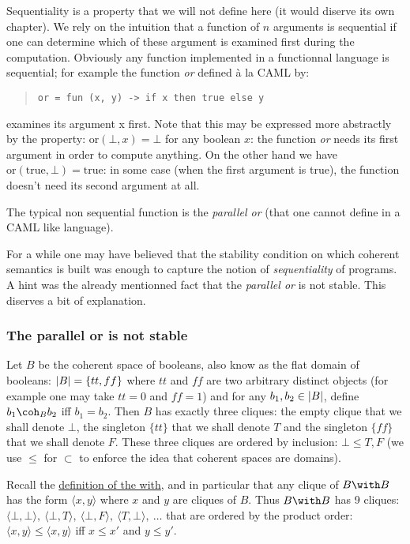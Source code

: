 Sequentiality is a property that we will not define here (it would
diserve its own chapter). We rely on the intuition that a function of
\(n\) arguments is sequential if one can determine which of these
argument is examined first during the computation. Obviously any
function implemented in a functionnal language is sequential; for
example the function \emph{or} defined à la CAML by:
\begin{quotation}
\texttt{or\ =\ fun\ (x,\ y)\ -\textgreater{}\ if\ x\ then\ true\ else\ y}
\end{quotation}
examines its argument x first. Note that this may be expressed more
abstractly by the property: \(\mathrm{or}(\bot, x) = \bot\) for any
boolean \(x\): the function \emph{or} needs its first argument in order
to compute anything. On the other hand we have
\(\mathrm{or}(\mathrm{true}, \bot) = \mathrm{true}\): in some case (when
the first argument is true), the function doesn't need its second
argument at all.

The typical non sequential function is the \emph{parallel or} (that one
cannot define in a CAML like language).

For a while one may have believed that the stability condition on which
coherent semantics is built was enough to capture the notion of
\emph{sequentiality} of programs. A hint was the already mentionned fact
that the \emph{parallel or} is not stable. This diserves a bit of
explanation.

\subsubsection{The parallel or is not stable}\label{the-parallel-or-is-not-stable}

Let \(B\) be the coherent space of booleans, also know as the flat
domain of booleans: \(\left|B\right| = \{tt, ff\}\) where \(tt\) and \(ff\) are
two arbitrary distinct objects (for example one may take \(tt = 0\) and
\(ff = 1\)) and for any \(b_1, b_2\in \left|B\right|\), define \(b_1\coh_B b_2\)
iff \(b_1 = b_2\). Then \(B\) has exactly three cliques: the empty
clique that we shall denote \(\bot\), the singleton \(\{tt\}\) that we
shall denote \(T\) and the singleton \(\{ff\}\) that we shall denote
\(F\). These three cliques are ordered by inclusion: \(\bot \leq T, F\)
(we use \(\leq\) for \(\subset\) to enforce the idea that coherent
spaces are domains).

Recall the \hyperref[cartesian-product]{definition of the
with}, and in particular that any clique of \(B\with B\) has the form
\(\langle x, y\rangle\) where \(x\) and \(y\) are cliques of \(B\). Thus
\(B\with B\) has 9 cliques:
\(\langle\bot,\bot\rangle,\ \langle\bot, T\rangle,\ \langle\bot, F\rangle,\ \langle T,\bot\rangle,\ \dots\)
that are ordered by the product order:
\(\langle x,y\rangle\leq \langle x,y\rangle\) iff \(x\leq x'\) and
\(y\leq y'\).

